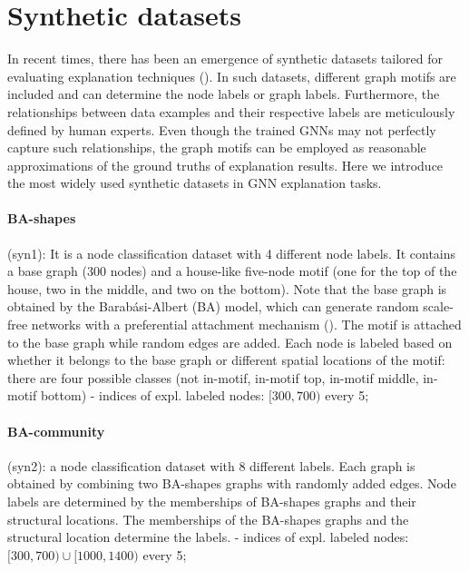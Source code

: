 \documentclass[binding=0.6cm]{sapthesis}
\newcommand{\mycite}[1]{(\cite{#1})}
\begin{document}
\section{Synthetic datasets}
\label{sec:expRes.syns-dataset}
In recent times, there has been an emergence of synthetic datasets tailored for evaluating explanation techniques (\cite{ying2019-gnnexplainer,luo2020-pgexplainer}). In such datasets, different graph motifs are included and can determine the node labels or graph labels. Furthermore, the relationships between data examples and their respective labels are meticulously defined by human experts. Even though the trained GNNs may not perfectly capture such relationships, the graph motifs can be employed as reasonable approximations of the ground truths of explanation results. Here we introduce the most widely used synthetic datasets in GNN explanation tasks.

\paragraph{BA-shapes}
\label{sec:expRes.ba-shapes}
(syn1): It is a node classification dataset with 4 different node labels. It contains a base graph (300 nodes) and a house-like five-node motif (one for the top of the house, two in the middle, and two on the bottom). 
Note that the base graph is obtained by the Barabási-Albert (BA) model, which can generate random scale-free networks with a preferential attachment mechanism \mycite{albert2002-barabasi}. 
The motif is attached to the base graph while random edges are added. Each node is labeled based on whether it belongs to the base graph or different spatial locations of the motif: there are four possible classes (not in-motif, in-motif top, in-motif middle, in-motif bottom) 
- indices of expl. labeled nodes: $[300,700)$ every 5;

\paragraph{BA-community}
\label{sec:expRes.ba-comms}
(syn2): a node classification dataset with 8 different labels. Each graph is obtained by combining two BA-shapes graphs with randomly added edges. Node labels are determined by the memberships of BA-shapes graphs and their structural locations. The memberships of the BA-shapes graphs and the structural location determine the labels.  
- indices of expl. labeled nodes: $[300,700) \cup [1000,1400)$ every 5; 
\end{document}
